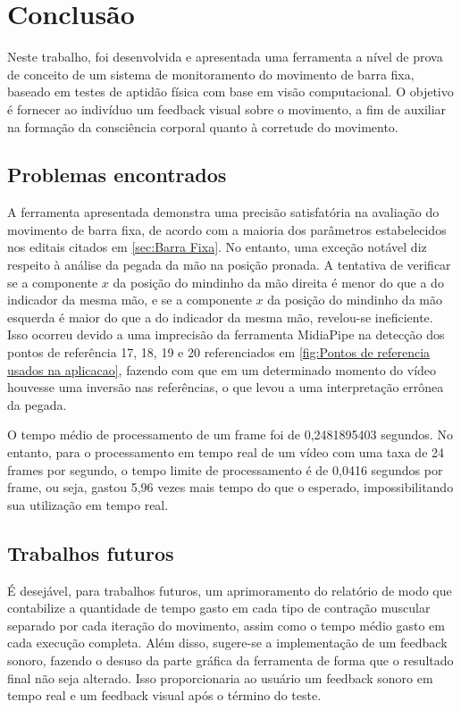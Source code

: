 \chapter{Conclusão}

Neste trabalho, foi desenvolvida e apresentada uma ferramenta a nível de prova de conceito de um sistema de monitoramento do movimento de barra fixa, baseado em testes de aptidão física com base em visão computacional. O objetivo é fornecer ao indivíduo um feedback visual sobre o movimento, a fim de auxiliar na formação da consciência corporal quanto à corretude do movimento.

\section[Problemas encontrados]{Problemas encontrados}\label{sec:Pontos fracos e possiveis melhorias}

A ferramenta apresentada demonstra uma precisão satisfatória na avaliação do movimento de barra fixa, de acordo com a maioria dos parâmetros estabelecidos nos editais citados em \ref{sec:Barra Fixa}. No entanto, uma exceção notável diz respeito à análise da pegada da mão na posição pronada. A tentativa de verificar se a componente $x$ da posição do mindinho da mão direita é menor do que a do indicador da mesma mão, e se a componente $x$ da posição do mindinho da mão esquerda é maior do que a do indicador da mesma mão, revelou-se ineficiente. Isso ocorreu devido a uma imprecisão da ferramenta MidiaPipe na detecção dos pontos de referência 17, 18, 19 e 20 referenciados em \ref{fig:Pontos de referencia usados na aplicacao}, fazendo com que em um determinado momento do vídeo houvesse uma inversão nas referências, o que levou a uma interpretação errônea da pegada.

O tempo médio de processamento de um frame foi de 0,2481895403 segundos. No entanto, para o processamento em tempo real de um vídeo com uma taxa de 24 frames por segundo, o tempo limite de processamento é de 0,0416 segundos por frame, ou seja, gastou 5,96 vezes mais tempo do que o esperado, impossibilitando sua utilização em tempo real.





\section[Trabalhos futuros]{Trabalhos futuros}
É desejável, para trabalhos futuros, um aprimoramento do relatório de modo que contabilize a quantidade de tempo gasto em cada tipo de contração muscular separado por cada iteração do movimento, assim como o tempo médio gasto em cada execução completa. Além disso, sugere-se a implementação de um feedback sonoro, fazendo o desuso da parte gráfica da ferramenta de forma que o resultado final não seja alterado. Isso proporcionaria ao usuário um feedback sonoro em tempo real e um feedback visual após o término do teste.

